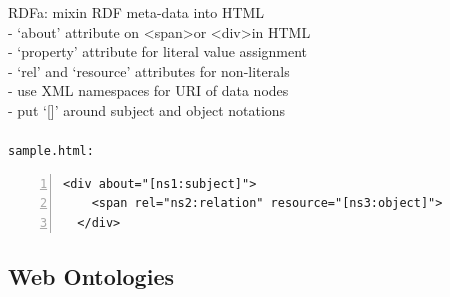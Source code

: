 RDFa: mixin RDF meta-data into HTML \\
- `about' attribute on \textless span\textgreater or \textless div\textgreater in HTML \\
- `property' attribute for literal value assignment \\
- `rel' and `resource' attributes for non-literals \\
- use XML namespaces for URI of data nodes \\
- put `[]' around subject and object notations \\
\\
\texttt{sample.html:}
\begin{lstlisting}[basicstyle=\ttfamily,numbers=left,numberstyle=\footnotesize\ttfamily,backgroundcolor=\color{sourcegray}]
  <div about="[ns1:subject]">
    <span rel="ns2:relation" resource="[ns3:object]">
  </div>
\end{lstlisting}


\subsection{Web Ontologies}
\label{sec:semantic_ontologies}

